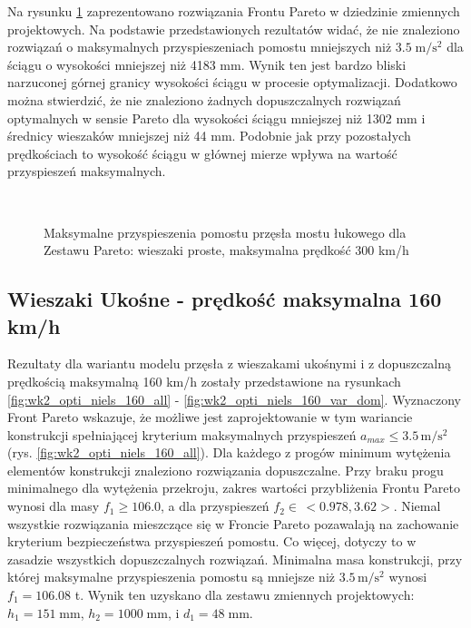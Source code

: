 Na rysunku \ref{fig:wk2_opti_proste_300_var_dom} zaprezentowano rozwiązania Frontu Pareto w dziedzinie zmiennych projektowych. Na podstawie przedstawionych rezultatów widać, że nie znaleziono rozwiązań o maksymalnych przyspieszeniach pomostu mniejszych niż $3.5\;\mathrm{m/s^2}$ dla ściągu o wysokości mniejszej niż 4183 mm. Wynik ten jest bardzo bliski narzuconej górnej granicy wysokości ściągu w procesie optymalizacji. Dodatkowo można stwierdzić, że nie znaleziono żadnych dopuszczalnych rozwiązań optymalnych w sensie Pareto dla wysokości ściągu mniejszej niż 1302 mm i średnicy wieszaków mniejszej niż 44 mm. Podobnie jak przy pozostałych prędkościach to wysokość ściągu w głównej mierze wpływa na wartość przyspieszeń maksymalnych.

\begin{figure}[hbt!]
	\centering
	\\
	\captionsetup{justification=centering}
	\caption{Maksymalne przyspieszenia pomostu przęsła mostu łukowego dla Zestawu Pareto: wieszaki proste, maksymalna prędkość 300 km/h}
	\label{fig:wk2_opti_proste_300_var_dom}
\end{figure}





\pagebreak[4]
\subsection{Wieszaki Ukośne - prędkość maksymalna 160 km/h}

Rezultaty dla wariantu modelu przęsła z wieszakami ukośnymi i z dopuszczalną prędkością maksymalną 160 km/h zostały przedstawione na rysunkach \ref{fig:wk2_opti_niels_160_all} - \ref{fig:wk2_opti_niels_160_var_dom}. Wyznaczony Front Pareto wskazuje, że możliwe jest zaprojektowanie w tym wariancie konstrukcji spełniającej kryterium maksymalnych przyspieszeń $a_{max}\le 3.5\,\mathrm{m/s^2}$ (rys. \ref{fig:wk2_opti_niels_160_all}). Dla każdego z progów minimum wytężenia elementów konstrukcji znaleziono rozwiązania dopuszczalne. Przy braku progu minimalnego dla wytężenia przekroju, zakres wartości przybliżenia Frontu Pareto wynosi dla masy $f_1 \ge 106.0$, a dla przyspieszeń $f_2 \in\,<0.978,3.62>$. Niemal wszystkie rozwiązania mieszczące się w Froncie Pareto pozawalają na zachowanie kryterium bezpieczeństwa przyspieszeń pomostu. Co więcej, dotyczy to w zasadzie wszystkich dopuszczalnych rozwiązań. Minimalna masa konstrukcji, przy której maksymalne przyspieszenia pomostu są mniejsze niż $3.5\,\mathrm{m/s^2}$ wynosi $f_1 = 106.08$ t. Wynik ten uzyskano dla zestawu zmiennych projektowych: $h_1 = 151\;\mathrm{mm}$, $h_2 = 1000\;\mathrm{mm}$, i $d_1 = 48\;\mathrm{mm}$.

